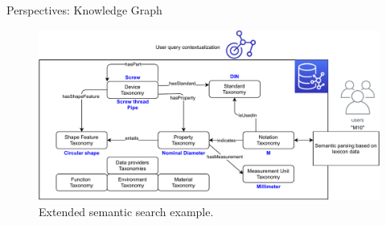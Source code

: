 \begin{frame}{Perspectives: Knowledge Graph}

    \begin{figure} [H]
        \begin{center}
            \includegraphics[scale=0.5]{images/semantic_search_example.pdf} 
            \caption{Extended semantic search example.} 
        \end{center}
    \end{figure}

\end{frame}